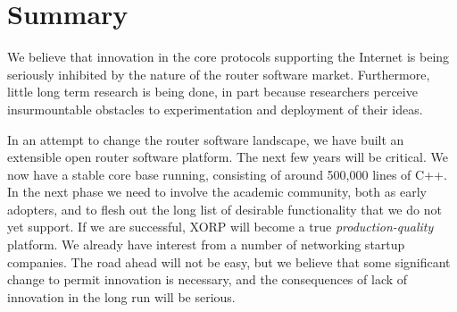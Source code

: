 
\section{Summary}




We believe that innovation in the core protocols supporting the
Internet is being seriously inhibited by the nature of the router
software market.  Furthermore, little long term research is being
done, in part because researchers perceive insurmountable obstacles to
experimentation and deployment of their ideas.

In an attempt to change the router software landscape, we have built
an extensible open router software platform.  The next few years will
be critical.  We now have a stable core base running, consisting of
around 500,000 lines of C++.  In the next phase we need to involve the
academic community, both as early adopters, and to flesh out the long
list of desirable functionality that we do not yet support.  If we are
successful, XORP will become a true {\it production-quality} platform.
We already have interest from a number of networking startup
companies.  The road ahead will not be easy, but we believe that some
significant change to permit innovation is necessary, and the
consequences of lack of innovation in the long run will be serious.


